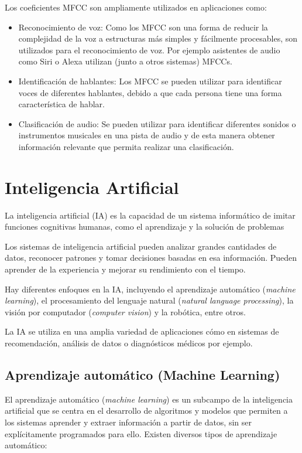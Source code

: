 Los coeficientes MFCC son ampliamente utilizados en aplicaciones como: 

\begin{itemize}
\tightlist
\item Reconocimiento de voz: Como los MFCC son una forma de reducir la complejidad de la voz a estructuras más simples y fácilmente procesables, son utilizados para el reconocimiento de voz. Por ejemplo asistentes de audio como Siri o Alexa utilizan (junto a otros sistemas) MFCCs.
\item Identificación de hablantes: Los MFCC se pueden utilizar para identificar voces de diferentes hablantes, debido a que cada persona tiene una forma característica de hablar.
\item Clasificación de audio: Se pueden utilizar para identificar diferentes sonidos o instrumentos musicales en una pista de audio y de esta manera obtener información relevante que permita realizar una clasificación.
\end{itemize}



\newpage

\section{Inteligencia Artificial}

La inteligencia artificial (IA) es la capacidad de un sistema informático de imitar funciones cognitivas humanas, como el aprendizaje y la solución de problemas

Los sistemas de inteligencia artificial pueden analizar grandes cantidades de datos, reconocer patrones y tomar decisiones basadas en esa información. Pueden aprender de la experiencia y mejorar su rendimiento con el tiempo. 

Hay diferentes enfoques en la IA, incluyendo el aprendizaje automático (\textit{machine learning}), el procesamiento del lenguaje natural (\textit{natural language processing}), la visión por computador (\textit{computer vision}) y la robótica, entre otros.

La IA se utiliza en una amplia variedad de aplicaciones cómo en sistemas de recomendación, análisis de datos o diagnósticos médicos por ejemplo.

\subsection{Aprendizaje automático (Machine Learning)}
El aprendizaje automático (\textit{machine learning}) es un subcampo de la inteligencia artificial que se centra en el desarrollo de algoritmos y modelos que permiten a los sistemas aprender y extraer información a partir de datos, sin ser explícitamente programados para ello.
Existen diversos tipos de aprendizaje automático:

